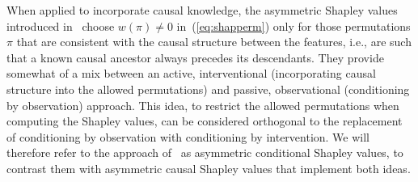 \documentclass{article}
\newcommand{\vX}{\mathbf{X}}
\newcommand{\vx}{\mathbf{x}}
\newcommand{\expectation}{\mathbb{E}}
\newcommand{\dodo}{\mathit{do}}
\newcommand{\lvdo}[1]{\dodo(\vX_{#1} = \vx_{#1})}
\newcommand{\perm}{\pi}
\newcommand{\comment}[1]{{\color{red} #1}}
\begin{document}





When applied to incorporate causal knowledge, the asymmetric Shapley values introduced in~\cite{frye2019asymmetric} choose $w(\perm) \neq 0$ in~(\ref{eq:shapperm}) only for those permutations $\perm$ that are consistent with the causal structure between the features, i.e., are such that a known causal ancestor always precedes its descendants. They provide somewhat of a mix between an active, interventional (incorporating causal structure into the allowed permutations) and passive, observational (conditioning by observation) approach. This idea, to restrict the allowed permutations when computing the Shapley values, can be considered orthogonal to the replacement of conditioning by observation with conditioning by intervention. We will therefore refer to the approach of~\cite{frye2019asymmetric} as asymmetric conditional Shapley values, to contrast them with asymmetric causal Shapley values that implement both ideas.
\end{document}
